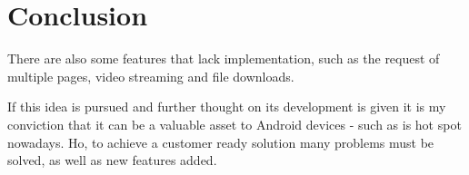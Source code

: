 
\chapter{Conclusion}
\label{chapter:conclusion}

There are also some features that lack implementation, such as the request of multiple pages, video streaming and file downloads.

If this idea is pursued and further thought on its development is given it is my conviction that it can be a valuable asset to Android devices - such as is hot spot nowadays. Ho, to achieve a customer ready solution many problems must be solved, as well as new features added.